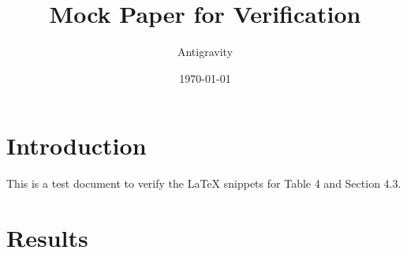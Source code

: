 \documentclass{article}
\title{Mock Paper for Verification}
\author{Antigravity}
\date{\today}
\begin{document}
\maketitle

\section{Introduction}
This is a test document to verify the LaTeX snippets for Table 4 and Section 4.3.

\section{Results}

\end{document}
